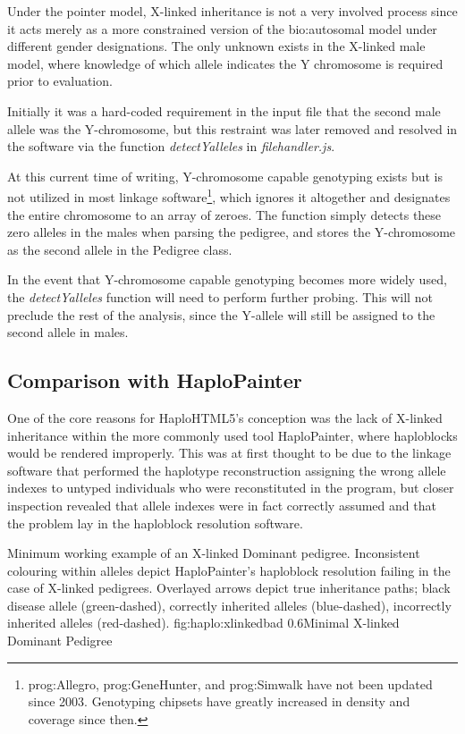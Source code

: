 Under the pointer model, X-linked inheritance is not a very involved process since it acts merely as a more constrained version of the \gls{bio:autosomal} model under different gender designations. The only unknown exists in the X-linked male model, where knowledge of which allele indicates the Y chromosome is required prior to evaluation.

Initially it was a hard-coded requirement in the input file that the second male allele was the Y-chromosome, but this restraint was later removed and resolved in the software via the function \textit{detectYalleles} in \textit{filehandler.js}.

At this current time of writing, Y-chromosome capable genotyping exists but is not utilized in most linkage software\footnote{\gls{prog:Allegro}, \gls{prog:GeneHunter}, and \gls{prog:Simwalk} have not been updated since 2003. Genotyping chipsets have greatly increased in density and coverage since then.}, which ignores it altogether and designates the entire chromosome to an array of zeroes. The function simply detects these zero alleles in the males when parsing the pedigree, and stores the Y-chromosome as the second allele in the Pedigree class.

In the event that Y-chromosome capable genotyping becomes more widely used, the \textit{detectYalleles} function will need to perform further probing. This will not preclude the rest of the analysis, since the Y-allele will still be assigned to the second allele in males.

\subsection{Comparison with HaploPainter}

One of the core reasons for HaploHTML5's conception was the lack of X-linked inheritance within the more commonly used tool HaploPainter, where haploblocks would be rendered improperly. This was at first thought to be due to the linkage software that performed the haplotype reconstruction assigning the wrong allele indexes to untyped individuals who were reconstituted in the program, but closer inspection revealed that allele indexes were in fact correctly assumed and that the problem lay in the haploblock resolution software.

	{Minimum working example of an X-linked Dominant pedigree. Inconsistent colouring within alleles depict HaploPainter's haploblock resolution failing in the case of X-linked pedigrees. Overlayed arrows depict true inheritance paths; black disease allele (green-dashed), correctly inherited alleles (blue-dashed), incorrectly inherited alleles (red-dashed).}
	{fig:haplo:xlinkedbad}
	{0.6}{Minimal X-linked Dominant Pedigree}
	
